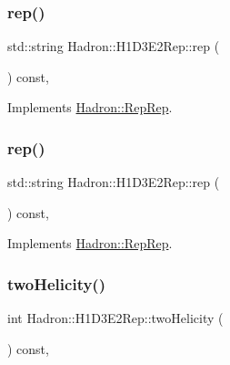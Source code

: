 \subsubsection{\texorpdfstring{rep()}{rep()}\hspace{0.1cm}{\footnotesize\ttfamily [2/3]}}
{\footnotesize\ttfamily std\+::string Hadron\+::\+H1\+D3\+E2\+Rep\+::rep (\begin{DoxyParamCaption}{ }\end{DoxyParamCaption}) const\hspace{0.3cm}{\ttfamily [inline]}, {\ttfamily [virtual]}}



Implements \mbox{\hyperlink{structHadron_1_1RepRep_ab3213025f6de249f7095892109575fde}{Hadron\+::\+Rep\+Rep}}.

\mbox{\label{structHadron_1_1H1D3E2Rep_ace031c7809b792a43f41c55b6b45c355}} 
\subsubsection{\texorpdfstring{rep()}{rep()}\hspace{0.1cm}{\footnotesize\ttfamily [3/3]}}
{\footnotesize\ttfamily std\+::string Hadron\+::\+H1\+D3\+E2\+Rep\+::rep (\begin{DoxyParamCaption}{ }\end{DoxyParamCaption}) const\hspace{0.3cm}{\ttfamily [inline]}, {\ttfamily [virtual]}}



Implements \mbox{\hyperlink{structHadron_1_1RepRep_ab3213025f6de249f7095892109575fde}{Hadron\+::\+Rep\+Rep}}.

\mbox{\label{structHadron_1_1H1D3E2Rep_abc2ae293f19603d5c8d08fc6f7fa7830}} 
\subsubsection{\texorpdfstring{twoHelicity()}{twoHelicity()}\hspace{0.1cm}{\footnotesize\ttfamily [1/2]}}
{\footnotesize\ttfamily int Hadron\+::\+H1\+D3\+E2\+Rep\+::two\+Helicity (\begin{DoxyParamCaption}{ }\end{DoxyParamCaption}) const\hspace{0.3cm}{\ttfamily [inline]}, {\ttfamily [virtual]}}

